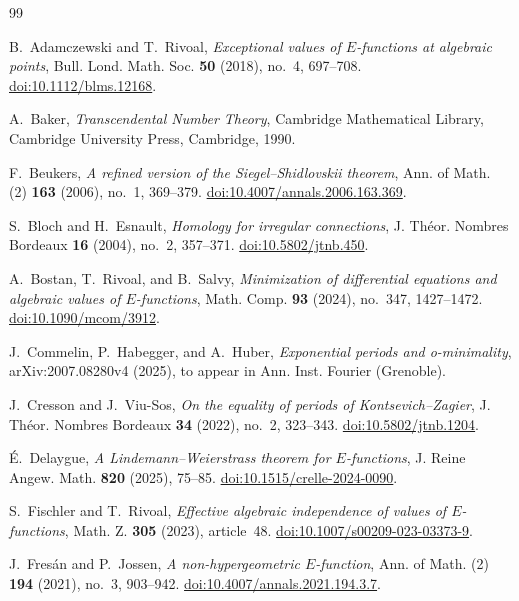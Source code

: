 \documentclass[11pt]{article}
\numberwithin{equation}{section}
\theoremstyle{definition}
\theoremstyle{remark}
\begin{document}
\small
\begin{thebibliography}{99}

B.~Adamczewski and T.~Rivoal,
\emph{Exceptional values of $E$-functions at algebraic points},
Bull. Lond. Math. Soc. \textbf{50} (2018), no.~4, 697--708.
\href{https://doi.org/10.1112/blms.12168}{doi:10.1112/blms.12168}.

A.~Baker,
\emph{Transcendental Number Theory},
Cambridge Mathematical Library,
Cambridge University Press, Cambridge, 1990.

F.~Beukers,
\emph{A refined version of the Siegel--Shidlovskii theorem},
Ann. of Math. (2) \textbf{163} (2006), no.~1, 369--379.
\href{https://doi.org/10.4007/annals.2006.163.369}{doi:10.4007/annals.2006.163.369}.

S.~Bloch and H.~Esnault,
\emph{Homology for irregular connections},
J. Th\'eor. Nombres Bordeaux \textbf{16} (2004), no.~2, 357--371.
\href{https://doi.org/10.5802/jtnb.450}{doi:10.5802/jtnb.450}.

A.~Bostan, T.~Rivoal, and B.~Salvy,
\emph{Minimization of differential equations and algebraic values of
$E$-functions},
Math. Comp. \textbf{93} (2024), no.~347, 1427--1472.
\href{https://doi.org/10.1090/mcom/3912}{doi:10.1090/mcom/3912}.

J.~Commelin, P.~Habegger, and A.~Huber,
\emph{Exponential periods and o-minimality},
arXiv:2007.08280v4 (2025), to appear in
Ann. Inst. Fourier (Grenoble).

J.~Cresson and J.~Viu-Sos,
\emph{On the equality of periods of Kontsevich--Zagier},
J. Th\'eor. Nombres Bordeaux \textbf{34} (2022), no.~2, 323--343.
\href{https://doi.org/10.5802/jtnb.1204}{doi:10.5802/jtnb.1204}.

\'E.~Delaygue,
\emph{A Lindemann--Weierstrass theorem for $E$-functions},
J. Reine Angew. Math. \textbf{820} (2025), 75--85.
\href{https://doi.org/10.1515/crelle-2024-0090}{doi:10.1515/crelle-2024-0090}.

S.~Fischler and T.~Rivoal,
\emph{Effective algebraic independence of values of $E$-functions},
Math. Z. \textbf{305} (2023), article~48.
\href{https://doi.org/10.1007/s00209-023-03373-9}{doi:10.1007/s00209-023-03373-9}.

J.~Fres\'an and P.~Jossen,
\emph{A non-hypergeometric $E$-function},
Ann. of Math. (2) \textbf{194} (2021), no.~3, 903--942.
\href{https://doi.org/10.4007/annals.2021.194.3.7}{doi:10.4007/annals.2021.194.3.7}.


\end{thebibliography}
\end{document}
